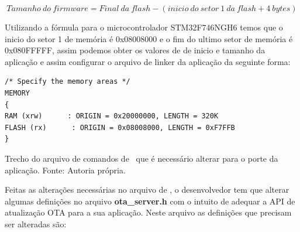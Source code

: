 \begin{equation}
    Tamanho\ do\ firmware = Final\ da\ flash - (inicio\ do\ setor\ 1\ da\ flash + 4\ bytes) 
    \label{eq:calculo_flash}
\end{equation}


Utilizando a fórmula para o microcontrolador STM32F746NGH6 temos que o inicio do setor 1 de memória é 0x08008000 e o fim do ultimo setor de memória é 0x080FFFFF, assim podemos obter os valores de de inicio e tamanho da aplicação e assim configurar o arquivo de linker da aplicação da seguinte forma:


\begin{algorithm}[H]
\begin{lstlisting}
/* Specify the memory areas */
MEMORY
{
RAM (xrw)      : ORIGIN = 0x20000000, LENGTH = 320K
FLASH (rx)      : ORIGIN = 0x08008000, LENGTH = 0xF7FFB
}
\end{lstlisting}
\caption{Trecho do arquivo de comandos de \linker\ que é necessário alterar para o porte da aplicação.
\newline Fonte: Autoria própria.}
\end{algorithm}

Feitas as alterações necessárias no arquivo de \linker, o desenvolvedor tem que alterar algumas definições no arquivo \textbf{ota\_server.h} com o intuito de adequar a API de atualização OTA para a sua aplicação. Neste arquivo as definições que precisam ser alteradas são:

